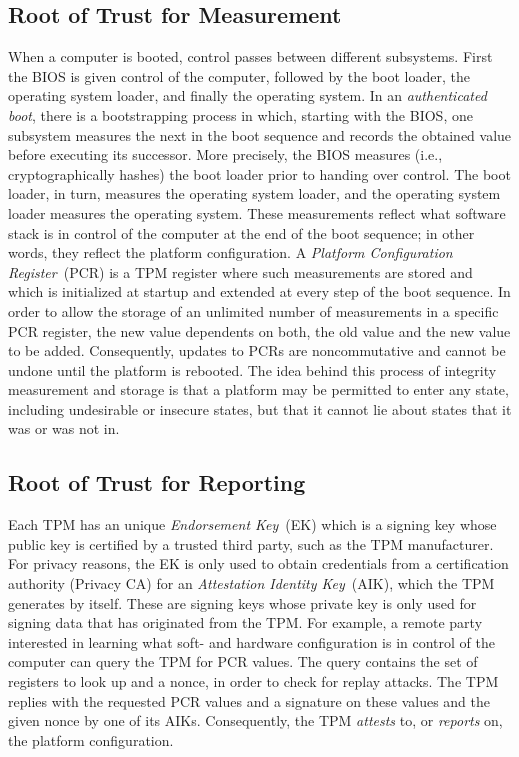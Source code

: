 \documentclass[runningheads]{llncs}
\begin{document}
\subsection{Root of Trust for Measurement}
When a computer is booted, control passes between different subsystems. First
the BIOS is given control of the computer, followed by the boot loader, the
operating system loader, and finally the operating system. In an
\emph{authenticated boot}, there is a bootstrapping process in which, starting
with the BIOS, one subsystem measures the next in the boot sequence and records
the obtained value before executing its successor. More precisely, the BIOS
measures (i.e., cryptographically hashes) the boot loader prior to handing
over control. The boot loader, in turn, measures the operating system loader,
and the operating system loader measures the operating system.
These measurements reflect what software stack is in control of the computer
at the end of the boot sequence; in other words, they reflect the platform
configuration. A \emph{Platform Configuration Register}~(PCR) is a TPM
register where such measurements are stored and which is initialized at
startup and extended at every step of the boot sequence. In order to allow
the storage of an unlimited number of measurements in a specific PCR register,
the new value dependents on both, the old value and the new value to be added.
Consequently, updates to PCRs are noncommutative and cannot be undone until
the platform is rebooted. The idea behind this process of integrity measurement
and storage is that a platform may be permitted to enter any state, including
undesirable or insecure states, but that it cannot lie about states that it
was or was not in.

\subsection{Root of Trust for Reporting}
Each TPM has an unique \emph{Endorsement Key}~(EK) which is a signing key
whose public key is certified by a trusted third party, such as the TPM
manufacturer. For privacy reasons, the EK is only used to obtain credentials
from a certification authority (Privacy CA) for an \emph{Attestation Identity
Key}~(AIK), which the TPM generates by itself.
These are signing keys whose private key is only used for signing data that
has originated from the TPM. For example, a remote party interested in
learning what soft- and hardware configuration is in control of the computer
can query the TPM for PCR values. The query contains the set of registers to
look up and a nonce, in order to check for replay attacks.
The TPM replies with the requested PCR values and a signature on these values
and the given nonce by one of its AIKs. Consequently, the TPM \emph{attests}
to, or \emph{reports} on, the platform configuration.
\end{document}
